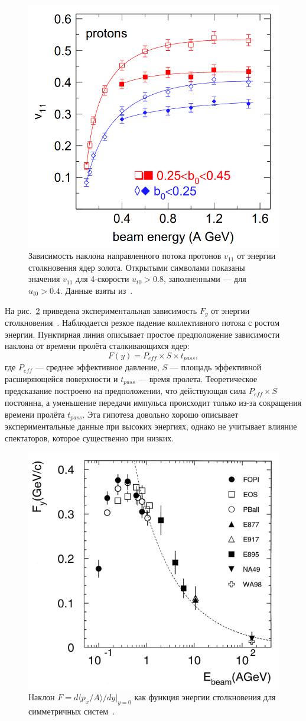 \begin{figure}
    \centering
    \includegraphics[width=0.5\linewidth]{images/FOPI_v11_energy.png}
    \caption{Зависимость наклона направленного потока протонов $v_{11}$ от энергии столкновения ядер золота. Открытыми символами показаны значения $v_{11}$ для 4-скорости $u_{t0}>0.8$, заполненными --- для $u_{t0}>0.4$. Данные взяты из~\cite{FOPI:2011aa}.}
    \label{fig:FOPI_v11_energy}
\end{figure}

На рис.~\ref{fig:Fy_summary} приведена экспериментальная зависимость $F_y$ от энергии столкновения~\cite{Herrmann:1999wu}.
Наблюдается резкое падение коллективного потока с ростом энергии.
Пунктирная линия описывает простое предположение зависимости наклона от времени пролёта сталкивающихся ядер:
%
\begin{equation}
    F(y) = P_{eff} \times S \times t_{pass},
\end{equation}
%
где $P_{eff}$ --- среднее эффективное давление, $S$ --- площадь эффективной расширяющейся поверхности и $t_{pass}$ --- время пролета.
Теоретическое предсказание построено на предположении, что действующая сила $P_{eff} \times S$ постоянна, а уменьшение передачи импульса происходит только из-за сокращения времени пролёта $t_{pass}$.
Эта гипотеза довольно хорошо описывает экспериментальные данные при высоких энергиях, однако не учитывает влияние спектаторов, которое существенно при низких.

\begin{figure}
    \centering
    \includegraphics[width=0.55\linewidth]{images/Fy_summary.png}
    \caption{Наклон $F=d\langle p_x /A \rangle / dy|_{y=0}$ как функция энергии столкновения для симметричных систем~\cite{Herrmann:1999wu}.}
    \label{fig:Fy_summary}
\end{figure}


